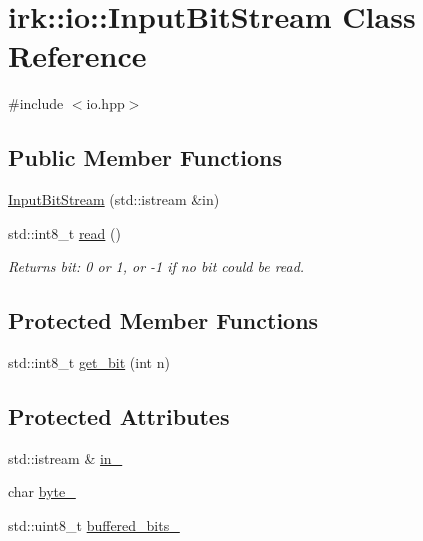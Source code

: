 \hypertarget{classirk_1_1io_1_1InputBitStream}{}\section{irk\+:\+:io\+:\+:Input\+Bit\+Stream Class Reference}
\label{classirk_1_1io_1_1InputBitStream}


{\ttfamily \#include $<$io.\+hpp$>$}

\subsection*{Public Member Functions}
\begin{DoxyCompactItemize}
\item 
\mbox{\hyperlink{classirk_1_1io_1_1InputBitStream_afa08070020e1eb261dafd8a18c2628af}{Input\+Bit\+Stream}} (std\+::istream \&in)
\item 
std\+::int8\+\_\+t \mbox{\hyperlink{classirk_1_1io_1_1InputBitStream_a2cb98a47f0f227df32f6823a224cc4e7}{read}} ()
\begin{DoxyCompactList}\small\item\em Returns bit\+: 0 or 1, or -\/1 if no bit could be read. \end{DoxyCompactList}\end{DoxyCompactItemize}
\subsection*{Protected Member Functions}
\begin{DoxyCompactItemize}
\item 
std\+::int8\+\_\+t \mbox{\hyperlink{classirk_1_1io_1_1InputBitStream_a38e944a5718eae8289fe9d01935cb183}{get\+\_\+bit}} (int n)
\end{DoxyCompactItemize}
\subsection*{Protected Attributes}
\begin{DoxyCompactItemize}
\item 
std\+::istream \& \mbox{\hyperlink{classirk_1_1io_1_1InputBitStream_aab3d3f7819e93097d56379b556cf7069}{in\+\_\+}}
\item 
char \mbox{\hyperlink{classirk_1_1io_1_1InputBitStream_a649c43cf73ac37366fe7ec49a1392447}{byte\+\_\+}}
\item 
std\+::uint8\+\_\+t \mbox{\hyperlink{classirk_1_1io_1_1InputBitStream_a1494d9938f01f851c54ca63767c806de}{buffered\+\_\+bits\+\_\+}}
\end{DoxyCompactItemize}


